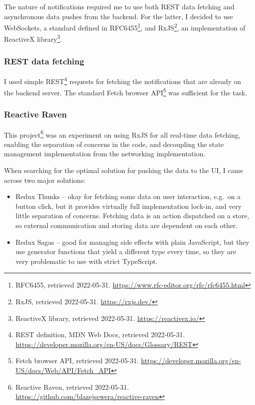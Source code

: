The nature of notifications required me to use both REST data fetching
and asynchronous data pushes from the backend. For the latter, I decided
to use WebSockets, a standard defined in RFC6455\footnote{RFC6455,
  retrieved 2022-05-31.
  \url{https://www.rfc-editor.org/rfc/rfc6455.html}}, and
RxJS\footnote{RxJS, retrieved 2022-05-31. \url{https://rxjs.dev/}}, an
implementation of ReactiveX library\footnote{ReactiveX library,
  retrieved 2022-05-31. \url{https://reactivex.io/}}.

\hypertarget{rest-data-fetching}{%
\subsubsection{REST data fetching}\label{rest-data-fetching}}

I used simple REST\footnote{REST definition, MDN Web Docs, retrieved
  2022-05-31.
  \url{https://developer.mozilla.org/en-US/docs/Glossary/REST}} requests
for fetching the notifications that are already on the backend server.
The standard Fetch browser API\footnote{Fetch browser API, retrieved
  2022-05-31.
  \url{https://developer.mozilla.org/en-US/docs/Web/API/Fetch_API}} was
sufficient for the task.

\hypertarget{reactive-raven}{%
\subsubsection{Reactive Raven}\label{reactive-raven}}

This project\footnote{Reactive Raven, retrieved 2022-05-31.
  \url{https://github.com/blazejsewera/reactive-raven}} was an
experiment on using RxJS for all real-time data fetching, enabling the
separation of concerns in the code, and decoupling the state management
implementation from the networking implementation.

When searching for the optimal solution for pushing the data to the UI,
I came across two major solutions:

\begin{itemize}
\tightlist
\item
  Redux Thunks -- okay for fetching some data on user interaction,
  e.g.~on a button click, but it provides virtually full implementation
  lock-in, and very little separation of concerns. Fetching data is an
  action dispatched on a store, so external communication and storing
  data are dependent on each other.
\item
  Redux Sagas -- good for managing side effects with plain JavaScript,
  but they use generator functions that yield a different type every
  time, so they are very problematic to use with strict TypeScript.
\end{itemize}

